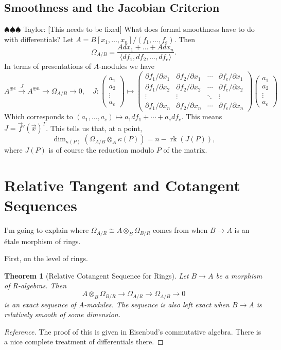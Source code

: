\documentclass[12pt]{article}
\numberwithin{equation}{section}
\newtheorem{theorem}{Theorem}[subsection]
\theoremstyle{definition}
\theoremstyle{remark}
\newcommand{\rk}{\operatorname{rk}}
\newcommand{\taylor}[1]{{\color{blue} \sf $\spadesuit\spadesuit\spadesuit$ Taylor: [#1]}}
\begin{document}
\subsection{Smoothness and the Jacobian Criterion}
\taylor{This needs to be fixed}
What does formal smoothness have to do with differentials?
Let $A = B[x_1,\ldots,x_n]/(f_1,\ldots,f_e)$.
Then 
$$\Omega_{A/B} = \dfrac{A dx_1 + \ldots  + A dx_n}{\langle df_1, df_2,\ldots,df_e \rangle }.$$
In terms of presentations of $A$-modules we have 
$$ A^{\oplus e} \xrightarrow{J} A^{\oplus n} \to \Omega_{A/B} \to 0, \quad J: \begin{pmatrix}
a_1\\
a_2\\
\vdots\\
a_e
\end{pmatrix}
\mapsto 
\begin{pmatrix}
\partial f_1/\partial x_1 & \partial f_2/\partial x_1& \cdots & \partial f_e/\partial x_1\\ 
\partial f_1/\partial x_2 & \partial f_2/\partial x_2 & \cdots & \partial f_e/\partial x_2 \\
\vdots & \vdots & \ddots & \vdots \\
\partial f_1/\partial x_n & \partial f_2/\partial x_n & \cdots & \partial f_e/\partial x_n  
\end{pmatrix}
\begin{pmatrix}
a_1\\
a_2\\
\vdots\\
a_e
\end{pmatrix}
$$
Which corresponds to $(a_1,\ldots,a_e) \mapsto a_1 df_1 + \cdots + a_e df_e$.
This means $J = \vec{f}'(\vec{x})^T$.
This tells us that, at a point, 
$$\dim_{\kappa(P)}(\Omega_{A/B} \otimes_A \kappa(P)) = n - \rk(J(P)),$$ 
where $J(P)$ is of course the reduction modulo $P$ of the matrix. 

\section{Relative Tangent and Cotangent Sequences}
I'm going to explain where $\Omega_{A/R} \cong A\otimes_B \Omega_{B/R}$ comes from when $B\to A$ is an \'{e}tale morphism of rings. 

First, on the level of rings.
\begin{theorem}[Relative Cotangent Sequence for Rings]
	Let $B \to A$ be a morphism of $R$-algebras. 
	Then 
	 $$ A \otimes_B \Omega_{B/R} \to \Omega_{A/R} \to \Omega_{A/B} \to 0$$
	is an exact sequence of $A$-modules.
	The sequence is also left exact when $B\to A$ is relatively smooth of some dimension.
\end{theorem}
\begin{proof}[Reference]
	The proof of this is given in Eisenbud's commutative algebra. 
	There is a nice complete treatment of differentials there. 
\end{proof}
\end{document}

